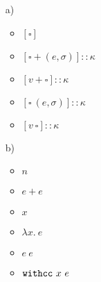 \begin{enumerate}
\begin{itemize}
  \item[a)] 

\begin{itemize}
  \item ${[\square]}$
    \begin{prooftree}
    \end{prooftree}
  \item ${[\square + (e, \sigma)]} :: \kappa$
    \begin{prooftree}
    \end{prooftree}
  \item ${[v + \square]} :: \kappa$

  \item ${[\square\ (e, \sigma)]} :: \kappa$

  \item ${[v\ \square]} :: \kappa$
\end{itemize}

  \item[b)] 
\begin{itemize}
  \item $n$
    \begin{prooftree}
    \end{prooftree}

  \item $e + e$
  \item $x$
  \item $\lambda x.\ e$
  \item $e\ e$
  \item $\mbox{\texttt{withcc}}\ x\ e$
\end{itemize}
\end{itemize}

\end{enumerate}
